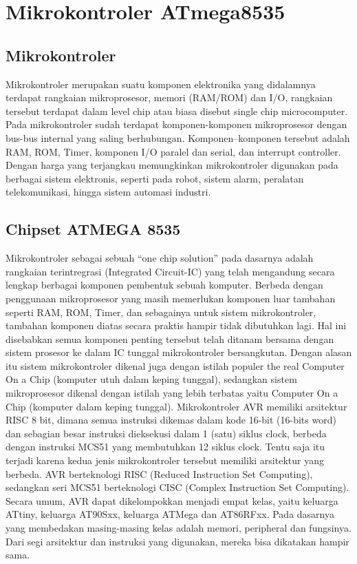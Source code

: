 \section{Mikrokontroler ATmega8535}

	\subsection{Mikrokontroler}
		Mikrokontroler merupakan suatu komponen elektronika yang didalamnya terdapat rangkaian mikroprosesor, memori (RAM/ROM) dan I/O, rangkaian tersebut terdapat dalam level chip atau biasa disebut single chip microcomputer. Pada mikrokontroler sudah terdapat komponen-komponen mikroprosesor dengan bus-bus internal yang saling berhubungan. Komponen–komponen tersebut adalah RAM, ROM, Timer, komponen I/O paralel dan serial, dan interrupt controller. Dengan harga yang terjangkau memungkinkan mikrokontroler digunakan pada berbagai sistem elektronis, seperti pada robot, sistem alarm, peralatan telekomunikasi, hingga sistem automasi industri.
		
	\subsection{Chipset ATMEGA 8535}
		Mikrokontroler sebagai sebuah “one chip solution” pada dasarnya adalah rangkaian terintregrasi (Integrated Circuit-IC) yang telah mengandung secara lengkap berbagai komponen pembentuk sebuah komputer. Berbeda dengan penggunaan mikroprosesor yang masih memerlukan komponen luar tambahan seperti RAM, ROM, Timer, dan sebagainya untuk sistem mikrokontroler, tambahan komponen diatas secara praktis hampir tidak dibutuhkan lagi. Hal ini disebabkan semua komponen penting tersebut telah ditanam bersama dengan sistem prosesor ke dalam IC tunggal mikrokontroler bersangkutan. Dengan alasan itu sistem mikrokontroler dikenal juga dengan istilah populer the real Computer On a Chip (komputer utuh dalam keping tunggal), sedangkan sistem mikroprosesor dikenal dengan istilah yang 	lebih terbatas yaitu Computer On a Chip (komputer dalam keping tunggal).
		Mikrokontroler AVR memiliki arsitektur RISC 8 bit, dimana semua instruksi dikemas dalam kode 16-bit (16-bits word) dan sebagian besar instruksi dieksekusi dalam 1 (satu) siklus clock, berbeda dengan instruksi MCS51 yang membutuhkan 12 siklus clock. Tentu saja itu terjadi karena kedua jenis mikrokontroler tersebut memiliki arsitektur yang berbeda. AVR berteknologi RISC (Reduced Instruction Set Computing), sedangkan seri MCS51 berteknologi CISC (Complex Instruction Set Computing). Secara umum, AVR dapat dikelompokkan menjadi empat kelas, yaitu keluarga ATtiny, keluarga AT90Sxx, keluarga ATMega dan AT86RFxx. Pada dasarnya yang membedakan masing-masing kelas adalah memori, peripheral dan fungsinya. Dari segi arsitektur dan instruksi yang digunakan, mereka bisa dikatakan hampir sama.
		
